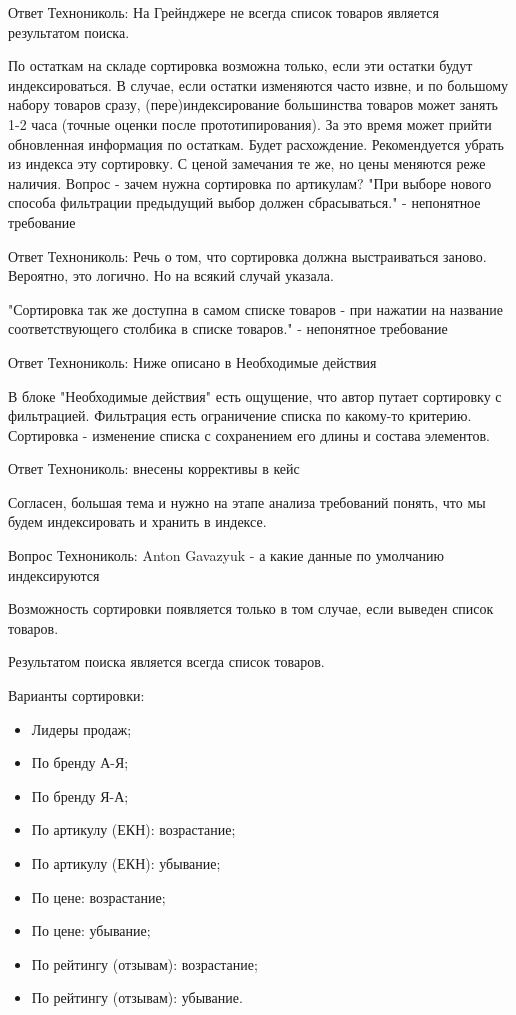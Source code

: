 {\begin{teamidea}
Ответ Технониколь: На Грейнджере не всегда список товаров является результатом поиска.

По остаткам на складе сортировка возможна только, если эти остатки будут индексироваться. В случае, если остатки изменяются часто извне, и по большому набору товаров сразу, (пере)индексирование большинства товаров может занять 1-2 часа (точные оценки после прототипирования). За это время может прийти обновленная информация по остаткам. Будет расхождение. Рекомендуется убрать из индекса эту сортировку.
С ценой замечания те же, но цены меняются реже наличия.
Вопрос - зачем нужна сортировка по артикулам?
"При выборе нового способа фильтрации предыдущий выбор должен сбрасываться." - непонятное требование

Ответ Технониколь: Речь о том, что сортировка должна выстраиваться заново. Вероятно, это логично. Но на всякий случай указала.

"Сортировка так же доступна в самом списке товаров - при нажатии на название соответствующего столбика в списке товаров." - непонятное требование

Ответ Технониколь: Ниже описано в Необходимые действия

В блоке "Необходимые действия" есть ощущение, что автор путает сортировку с фильтрацией. Фильтрация есть ограничение списка по какому-то критерию. Сортировка - изменение списка с сохранением его длины и состава элементов.

Ответ Технониколь: внесены коррективы в кейс
\end{teamidea}

\begin{hybris}
Согласен, большая тема и нужно на этапе анализа требований понять, что мы будем индексировать и хранить в индексе.

Вопрос Технониколь: Anton Gavazyuk - а какие данные по умолчанию индексируются
\end{hybris}


\begin{itogolong}
Возможность сортировки появляется только в том случае, если выведен список товаров.

Результатом поиска является всегда список товаров. 

Варианты сортировки:
\begin{itemize}
\item Лидеры продаж;
\item По бренду А-Я;
\item По бренду Я-А;
\item По артикулу (ЕКН): возрастание;
\item По артикулу (ЕКН): убывание;
\item По цене: возрастание;
\item По цене: убывание;
\item По рейтингу (отзывам): возрастание;
\item По рейтингу (отзывам): убывание.
\end{itemize}


\end{itogolong}}
